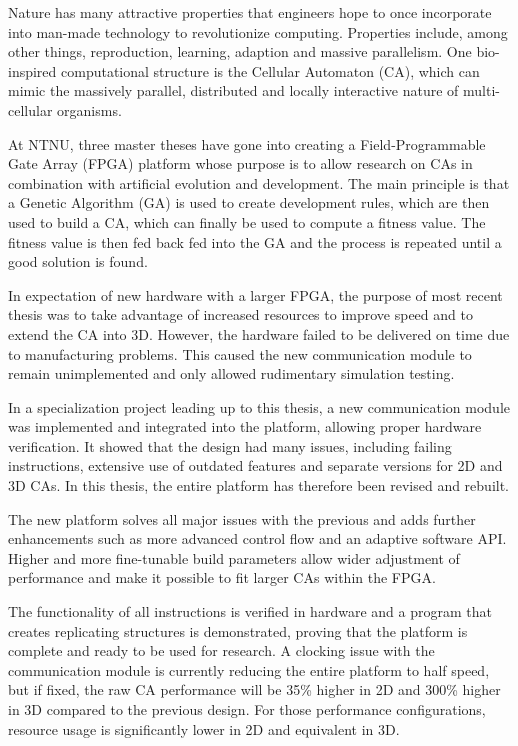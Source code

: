 Nature has many attractive properties that engineers hope to once incorporate into man-made technology to revolutionize computing.
Properties include, among other things, reproduction, learning, adaption and massive parallelism.
One bio-inspired computational structure is the Cellular Automaton (CA), which can mimic the massively parallel, distributed and locally interactive nature of multi-cellular organisms.

At NTNU, three master theses have gone into creating a Field-Programmable Gate Array (FPGA) platform whose purpose is to allow research on CAs in combination with artificial evolution and development.
The main principle is that a Genetic Algorithm (GA) is used to create development rules, which are then used to build a CA, which can finally be used to compute a fitness value.
The fitness value is then fed back fed into the GA and the process is repeated until a good solution is found.

In expectation of new hardware with a larger FPGA, the purpose of most recent thesis was to take advantage of increased resources to improve speed and to extend the CA into 3D.
However, the hardware failed to be delivered on time due to manufacturing problems.
This caused the new communication module to remain unimplemented and only allowed rudimentary simulation testing.

In a specialization project leading up to this thesis, a new communication module was implemented and integrated into the platform, allowing proper hardware verification.
It showed that the design had many issues, including failing instructions, extensive use of outdated features and separate versions for 2D and 3D CAs.
In this thesis, the entire platform has therefore been revised and rebuilt.

The new platform solves all major issues with the previous and adds further enhancements such as more advanced control flow and an adaptive software API.
Higher and more fine-tunable build parameters allow wider adjustment of performance and make it possible to fit larger CAs within the FPGA.

The functionality of all instructions is verified in hardware and a program that creates replicating structures is demonstrated, proving that the platform is complete and ready to be used for research.
A clocking issue with the communication module is currently reducing the entire platform to half speed, but if fixed, the raw CA performance will be 35\% higher in 2D and 300\% higher in 3D compared to the previous design.
For those performance configurations, resource usage is significantly lower in 2D and equivalent in 3D.
